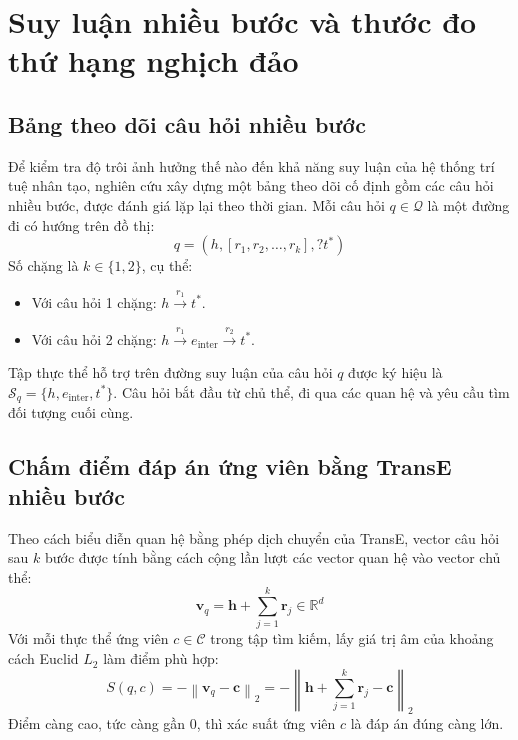 \section{Suy luận nhiều bước và thước đo thứ hạng nghịch đảo}
\label{sec:multi_hop_qa}

\subsection{Bảng theo dõi câu hỏi nhiều bước}
Để kiểm tra độ trôi ảnh hưởng thế nào đến khả năng suy luận của hệ thống trí tuệ nhân tạo, nghiên cứu xây dựng một bảng theo dõi cố định gồm các câu hỏi nhiều bước, được đánh giá lặp lại theo thời gian. Mỗi câu hỏi $q \in \mathcal{Q}$ là một đường đi có hướng trên đồ thị:
\begin{equation}
q = \left(h, [r_1, r_2, \dots, r_k], ?t^*\right)
\end{equation}
Số chặng là $k \in \{1, 2\}$, cụ thể:
\begin{itemize}
    \item Với câu hỏi 1 chặng: $h \xrightarrow{r_1} t^*$.
    \item Với câu hỏi 2 chặng: $h \xrightarrow{r_1} e_{\text{inter}} \xrightarrow{r_2} t^*$.
\end{itemize}
Tập thực thể hỗ trợ trên đường suy luận của câu hỏi $q$ được ký hiệu là $\mathcal{S}_q = \{h, e_{\text{inter}}, t^*\}$. Câu hỏi bắt đầu từ chủ thể, đi qua các quan hệ và yêu cầu tìm đối tượng cuối cùng.

\subsection{Chấm điểm đáp án ứng viên bằng TransE nhiều bước}
Theo cách biểu diễn quan hệ bằng phép dịch chuyển của TransE, vector câu hỏi sau $k$ bước được tính bằng cách cộng lần lượt các vector quan hệ vào vector chủ thể:
\begin{equation}
\mathbf{v}_q = \mathbf{h} + \sum_{j=1}^k \mathbf{r}_j \in \mathbb{R}^d
\end{equation}
Với mỗi thực thể ứng viên $c \in \mathcal{C}$ trong tập tìm kiếm, lấy giá trị âm của khoảng cách Euclid $L_2$ làm điểm phù hợp:
\begin{equation}
S(q, c) = - \left\| \mathbf{v}_q - \mathbf{c} \right\|_2 = - \left\| \mathbf{h} + \sum_{j=1}^k \mathbf{r}_j - \mathbf{c} \right\|_2
\end{equation}
Điểm càng cao, tức càng gần 0, thì xác suất ứng viên $c$ là đáp án đúng càng lớn.

